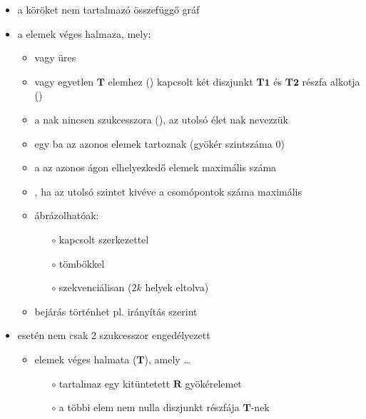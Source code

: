 \documentclass[main.tex]{subfiles}
\begin{document}
  \begin{itemize}
    \item a  köröket nem tartalmazó összefüggő gráf
    
    \item a  elemek véges halmaza, mely:
    \begin{itemize}
      \item vagy üres
      
      \item vagy egyetlen $\mathbf{T}$ elemhez ()
      kapcsolt két diszjunkt $\mathbf{T1}$ és $\mathbf{T2}$
      részfa alkotja ()

      \item a nak nincsen szukcesszora
      (), az utolsó élet nak nevezzük
      
      \item egy ba az azonos
       elemek tartoznak
      (gyökér szintszáma 0)
      
      \item a  az azonos ágon elhelyezkedő
      elemek maximális száma
      
      \item {}, ha az utolsó szintet kivéve
      a csomópontok száma maximális

      \item ábrázolhatóak:
      \begin{itemize}
        \item[$\circ$] kapcsolt szerkezettel
        \item[$\circ$] tömbökkel
        \item[$\circ$] szekvenciálisan ($2k$ helyek eltolva)
      \end{itemize}

      \item bejárás történhet pl. irányítás szerint
    \end{itemize}

    \item {} esetén
    nem csak 2 szukcesszor engedélyezett
    \begin{itemize}
      \item elemek véges halmata ($\mathbf{T}$), amely \dots
      \begin{itemize}
        \item[$\circ$] tartalmaz egy kitüntetett
        $\mathbf{R}$ gyökérelemet
        \item[$\circ$] a többi elem nem nulla diszjunkt
        részfája $\mathbf{T}$-nek
      \end{itemize}
    \end{itemize}
    

\end{itemize}
\end{document}
